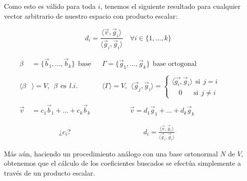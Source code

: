 \documentclass[12pt,dvipsnames]{article}
\numberwithin{equation}{section}
\begin{document}
Como esto es válido para toda $i$, tenemos el siguiente resultado para cualquier vector arbitrario de nuestro espacio con producto escalar:

\[d_i = \frac{\langle \vec{v} ,\vec{g}_i \rangle}{\langle\vec{g}_i, \vec{g}_i\rangle} \quad \forall i\in\{1,...,k\} \]

\begin{align*}
    \beta&=\{\vec{b}_1,...,\vec{b}_k\} \ \ \text{base}& &\Gamma=\{\vec{g}_1,...,\vec{g}_k\} \ \ \text{base ortogonal}& & &\\
    \\
    \langle\beta&\rangle = V, \ \ \beta \ \ \text{es} \ \ l.i.& &\langle\Gamma\rangle = V, \ \ \langle \vec{g}_j , \vec{g}_i \rangle = \begin{cases} \langle\vec{g_i}, \vec{g}_i\rangle \ \ \text{si} \ \ j = i \\ \quad 0 \quad \ \ \ \text{si} \ \ j\neq i \end{cases}& & &\\
    \\
    \vec{v}&= c_1\vec{b}_1 + ... + c_k\vec{b}_k& &\quad \quad \quad \quad \vec{v}= d_1\vec{g}_1 + ... + d_k\vec{g}_k& & & \\
    \\
    \\
    &\quad \quad \quad \quad \text{¿}c_i\text{?}& &\quad \quad \quad \quad \quad \quad d_i = \frac{\langle \vec{v} ,\vec{g}_i \rangle}{\langle\vec{g}_i, \vec{g}_i\rangle}& & &
\end{align*}

Más aún, haciendo un procedimiento análogo con una base ortonormal $N$ de $V$, obtenemos que el cálculo de los coeficientes buscados se efectúa simplemente a través de un producto escalar.
\end{document}
